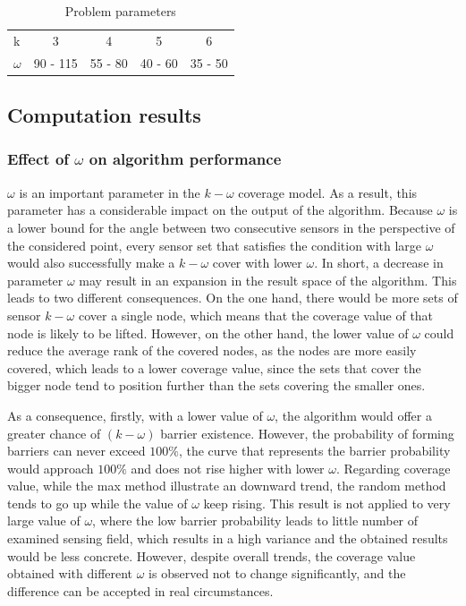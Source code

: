 \begin{table}[h!]
	\centering
	\begin{tabular}{l | c | c | c | c}
		k & 3 & 4 & 5 & 6\\
		$\omega$ & 90 - 115 & 55 - 80 & 40 - 60 & 35 - 50\\
	\end{tabular}
	\caption{Problem parameters}
\end{table}

\subsection{Computation results}

\subsubsection{Effect of $\omega$ on algorithm performance}

$\omega$ is an important parameter in the $k-\omega$ coverage model. As a result, this parameter has a considerable impact on the output of the algorithm. Because $\omega$ is a lower bound for the angle between two consecutive sensors in the perspective of the considered point, every sensor set that satisfies the condition with large $\omega$ would also successfully make a $k-\omega$ cover with lower $\omega$. In short, a decrease in parameter $\omega$ may result in an expansion in the result space of the algorithm. This leads to two different consequences. On the one hand, there would be more sets of sensor $k-\omega$ cover a single node, which means that the coverage value of that node is likely to be lifted. However, on the other hand, the lower value of $\omega$ could reduce the average rank of the covered nodes, as the nodes are more easily covered, which leads to a lower coverage value, since the sets that cover the bigger node tend to position further than the sets covering the smaller ones.

As a consequence, firstly, with a lower value of $\omega$, the algorithm would offer a greater chance of $(k-\omega)$ barrier existence. However, the probability of forming barriers can never exceed $100\%$, the curve that represents the barrier probability would approach $100\%$ and does not rise higher with lower $\omega$. Regarding coverage value, while the max method illustrate an downward trend, the random method tends to go up while the value of $\omega$ keep rising. This result is not applied to very large value of $\omega$, where the low barrier probability leads to little number of examined sensing field, which results in a high variance and the obtained results would be less concrete. However, despite overall trends, the coverage value obtained with different $\omega$ is observed not to change significantly, and the difference can be accepted in real circumstances.

